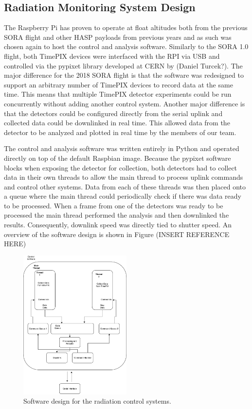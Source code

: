 \subsection{Radiation Monitoring System Design}
\label{sec:Radiation Design}
The Raspberry Pi has proven to operate at float altitudes both from the previous SORA flight and other HASP payloads from previous years and as such was chosen again to host the control and analysis software. Similarly to the SORA 1.0 flight, both TimePIX devices were interfaced with the RPI via USB and controlled via the pypixet library developed at CERN by (Daniel Turcek?). The major difference for the 2018 SORA flight is that the software was redesigned to support an arbitrary number of TimePIX devices to record data at the same time. This means that multiple TimePIX detector experiments could be run concurrently without adding another control system. Another major difference is that the detectors could be configured directly from the serial uplink and collected data could be downlinked in real time. This allowed data from the detector to be analyzed and plotted in real time by the members of our team.

The control and analysis software was written entirely in Python and operated directly on top of the default Raspbian image. Because the pypixet software blocks when exposing the detector for collection, both detectors had to collect data in their own threads to allow the main thread to process uplink commands and control other systems. Data from each of these threads was then placed onto a queue where the main thread could periodically check if there was data ready to be processed. When a frame from one of the detectors was ready to be processed the main thread performed the analysis and then downlinked the results. Consequently, downlink speed was directly tied to shutter speed. An overview of the software design is shown in Figure (INSERT REFERENCE HERE)

\begin{figure}[h!]
	\begin{center}
	\includegraphics[width=0.5\textwidth]{figures/SoftwareDesign.pdf}
	\caption{Software design for the radiation control systems.}
	\label{softwaredesign}
	\end{center}
\end{figure}
\clearpage
 
